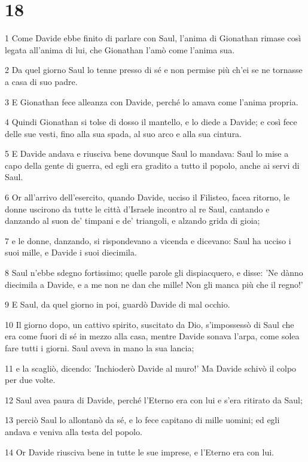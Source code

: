 \chapter{18}

\par 1 Come Davide ebbe finito di parlare con Saul, l'anima di Gionathan rimase così legata all'anima di lui, che Gionathan l'amò come l'anima sua.
\par 2 Da quel giorno Saul lo tenne presso di sé e non permise più ch'ei se ne tornasse a casa di suo padre.
\par 3 E Gionathan fece alleanza con Davide, perché lo amava come l'anima propria.
\par 4 Quindi Gionathan si tolse di dosso il mantello, e lo diede a Davide; e così fece delle sue vesti, fino alla sua spada, al suo arco e alla sua cintura.
\par 5 E Davide andava e riusciva bene dovunque Saul lo mandava: Saul lo mise a capo della gente di guerra, ed egli era gradito a tutto il popolo, anche ai servi di Saul.
\par 6 Or all'arrivo dell'esercito, quando Davide, ucciso il Filisteo, facea ritorno, le donne uscirono da tutte le città d'Israele incontro al re Saul, cantando e danzando al suon de' timpani e de' triangoli, e alzando grida di gioia;
\par 7 e le donne, danzando, si rispondevano a vicenda e dicevano: Saul ha ucciso i suoi mille, e Davide i suoi diecimila.
\par 8 Saul n'ebbe sdegno fortissimo; quelle parole gli dispiacquero, e disse: 'Ne dànno diecimila a Davide, e a me non ne dan che mille! Non gli manca più che il regno!'
\par 9 E Saul, da quel giorno in poi, guardò Davide di mal occhio.
\par 10 Il giorno dopo, un cattivo spirito, suscitato da Dio, s'impossessò di Saul che era come fuori di sé in mezzo alla casa, mentre Davide sonava l'arpa, come solea fare tutti i giorni. Saul aveva in mano la sua lancia;
\par 11 e la scagliò, dicendo: 'Inchioderò Davide al muro!' Ma Davide schivò il colpo per due volte.
\par 12 Saul avea paura di Davide, perché l'Eterno era con lui e s'era ritirato da Saul;
\par 13 perciò Saul lo allontanò da sé, e lo fece capitano di mille uomini; ed egli andava e veniva alla testa del popolo.
\par 14 Or Davide riusciva bene in tutte le sue imprese, e l'Eterno era con lui.
